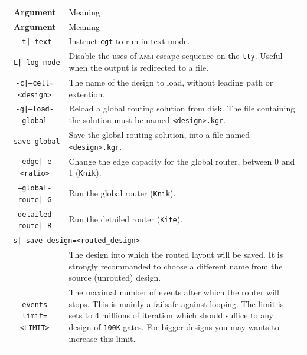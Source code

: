 \documentclass[11pt]{article}
\newcommand {\ANSI}               {\textsc{ansi}\xspace}
\newcommand {\tty}                {\texttt{tty}\xspace}
\newcommand {\Knik}               {\texttt{Knik}\xspace}
\newcommand {\Kite}               {\texttt{Kite}\xspace}
\newcommand {\cgt}                {\texttt{cgt}\xspace}
\begin{document}
  \begin{center}
  \begin{longtable}{|c|p{}|}
      \hline
      \textbf{Argument} & Meaning \\
      \latex{\hline}
      \hline
    \endfirsthead
      \hline
      \textbf{Argument} & Meaning \\
      \latex{\hline}
      \hline
    \endhead
      \hline
    \endfoot
    \endlastfoot
    \latex{\hline}
    \texttt{-t|--text}
      & Instruct \cgt to run in text mode. \\
    \hline
    \texttt{-L|--log-mode}
      & Disable the uses of \ANSI escape sequence on the \tty. Useful when
        the output is redirected to a file. \\
    \hline
    \texttt{-c|--cell=<design>}
      & The name of the design to load, without leading path or
        extention. \\
    \hline
    \texttt{-g|--load-global}
      & Reload a global routing solution from disk. \linebreak
        The file containing the solution must be named \texttt{<design>.kgr}. \\
    \hline
    \texttt{--save-global}
      & Save the global routing solution, into a file named \texttt{<design>.kgr}. \\
    \hline
    \texttt{--edge|-e <ratio>}
      & Change the edge capacity for the global router, between 0 and 1 (\Knik). \\
    \hline
    \texttt{--global-route|-G}
      & Run the global router (\Knik). \\
    \hline
    \texttt{--detailed-route|-R}
      & Run the detailed router (\Kite). \\
    \hline
    \multicolumn{2}{|l|}{\texttt{-s|--save-design=<routed\_design>}} \\
    \cline{1-1}
      & The design into which the routed layout will be saved. It is strongly
        recommanded to choose a different name from the source (unrouted)
        design. \\
    \hline
    \texttt{--events-limit=<LIMIT>}
      & The maximal number of events after which the router will stops. This is
        mainly a failsafe against looping. The limit is sets to 4 millions of
        iteration which should suffice to any design of \texttt{100K}\xspace
        gates. For bigger designs you may wants to increase this limit. \\
    \latex{\hline}
  \end{longtable}
  \end{center}
\end{document}
